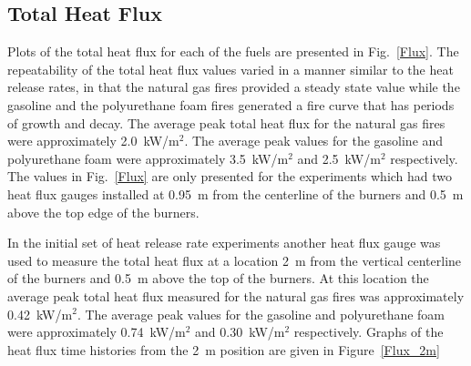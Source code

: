 \documentclass[twoside]{uocthesis}
\begin{document}
{\subsection{Total Heat Flux}

Plots of the total heat flux for each of the fuels are presented in Fig.~\ref{Flux}. The repeatability of the total heat flux values varied in a manner similar to the heat release rates, in that the natural gas fires provided a steady state value while the gasoline and the polyurethane foam fires generated a fire curve that has periods of growth and decay.  The average peak total heat flux for the natural gas fires were approximately 2.0~kW/m$^2$.  The average peak values for the gasoline and polyurethane foam were approximately 3.5~kW/m$^2$ and 2.5~kW/m$^2$ respectively.  The values in Fig.~\ref{Flux} are only presented for the experiments which had two heat flux gauges installed at 0.95~m from the centerline of the burners and 0.5~m above the top edge of the burners. 

In the initial set of heat release rate experiments another heat flux gauge was used to measure the total heat flux at a location 2~m from the vertical centerline of the burners and 0.5~m above the top of the burners.  At this location the average peak total heat flux measured for the natural gas fires was approximately 0.42~kW/m$^2$.  The average peak values for the gasoline and polyurethane foam were approximately 0.74~kW/m$^2$ and 0.30~kW/m$^2$ respectively. Graphs of the heat flux time histories from the 2~m position are given in Figure~\ref{Flux_2m} 

}
\end{document}
